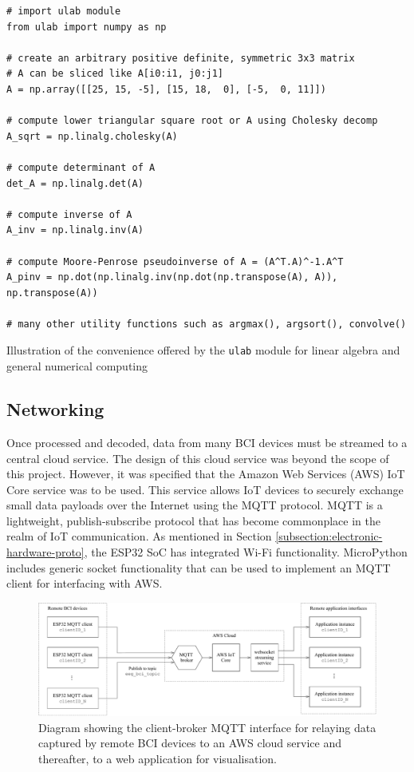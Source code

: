 \begin{listing}[h]
\small
\begin{verbatim}
# import ulab module
from ulab import numpy as np

# create an arbitrary positive definite, symmetric 3x3 matrix
# A can be sliced like A[i0:i1, j0:j1]
A = np.array([[25, 15, -5], [15, 18,  0], [-5,  0, 11]])

# compute lower triangular square root or A using Cholesky decomp
A_sqrt = np.linalg.cholesky(A)

# compute determinant of A
det_A = np.linalg.det(A)

# compute inverse of A
A_inv = np.linalg.inv(A)

# compute Moore-Penrose pseudoinverse of A = (A^T.A)^-1.A^T
A_pinv = np.dot(np.linalg.inv(np.dot(np.transpose(A), A)), np.transpose(A))

# many other utility functions such as argmax(), argsort(), convolve()

\end{verbatim}
\caption{Illustration of the convenience offered by the \texttt{ulab} module for linear algebra and general numerical computing}
\label{listing:ulab-intro}
\end{listing}

\subsection{Networking}
Once processed and decoded, data from many BCI devices must be streamed to a central cloud service. The design of this cloud service was beyond the scope of this project. However, it was specified that the Amazon Web Services (AWS) IoT Core service was to be used. This service allows IoT devices to securely exchange small data payloads over the Internet using the MQTT protocol. MQTT is a lightweight, publish-subscribe protocol that has become commonplace in the realm of IoT communication. As mentioned in Section \ref{subsection:electronic-hardware-proto}, the ESP32 SoC has integrated Wi-Fi functionality. MicroPython includes generic socket functionality that can be used to implement an MQTT client for interfacing with AWS.

\begin{figure}[!htb]
    \centering
    \includegraphics[width=\textwidth]{network-diagram}
    \caption{Diagram showing the client-broker MQTT interface for relaying data captured by remote BCI devices to an AWS cloud service and thereafter, to a web application for visualisation. }
    \label{fig:networking-diagram-c5}
\end{figure}

